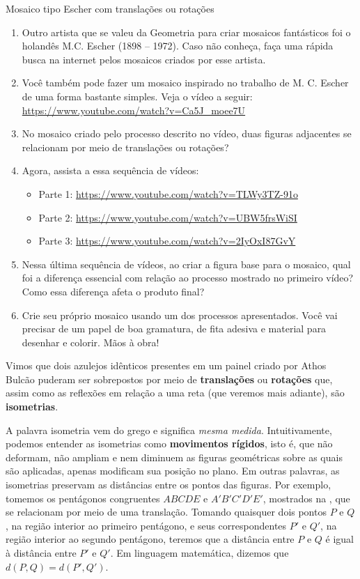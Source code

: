 \begin{task}{Mosaico tipo Escher com translações ou rotações}
\begin{enumerate}
\item Outro artista que se valeu da Geometria para criar mosaicos fantásticos foi o holandês M.C. Escher (1898 – 1972). Caso não conheça, faça uma rápida busca na internet pelos mosaicos criados por esse artista.

\item Você também pode fazer um mosaico inspirado no trabalho de M. C. Escher de uma forma bastante simples. Veja o vídeo a seguir: \url{https://www.youtube.com/watch?v=Ca5J_moee7U}

\item No mosaico criado pelo processo descrito no vídeo, duas figuras adjacentes se relacionam por meio de translações ou rotações?

\item Agora, assista a essa sequência de vídeos: 
\begin{itemize}
\item Parte 1: \url{https://www.youtube.com/watch?v=TLWy3TZ-91o}
\item Parte 2: \url{https://www.youtube.com/watch?v=UBW5frsWiSI}
\item Parte 3: \url{https://www.youtube.com/watch?v=2IyOxI87GvY}
\end{itemize}

\item Nessa última sequência de vídeos, ao criar a figura base para o mosaico, qual foi a diferença essencial com relação ao processo mostrado no primeiro vídeo? Como essa diferença afeta o produto final?

\item Crie seu próprio mosaico usando um dos processos apresentados. Você vai precisar de um papel de boa gramatura, de fita adesiva e material para desenhar e colorir. Mãos à obra!
\end{enumerate}
\end{task}


Vimos que dois azulejos idênticos presentes em um painel criado por Athos Bulcão puderam ser sobrepostos por meio de \textbf{translações} ou \textbf{rotações} que, assim como as reflexões em relação a uma reta (que veremos mais adiante), são \textbf{isometrias}. 

A palavra isometria vem do grego e significa \textit{mesma medida}. Intuitivamente, podemos entender as isometrias como \textbf{movimentos rígidos}, isto é, que não deformam, não ampliam e nem diminuem as figuras geométricas sobre as quais são aplicadas, apenas modificam sua posição no plano. Em outras palavras, as isometrias preservam as distâncias entre os pontos das figuras. Por exemplo, tomemos os pentágonos congruentes $ABCDE$ e $A'B'C'D'E'$, mostrados na , que se relacionam por meio de uma translação. Tomando quaisquer dois pontos $P$ e $Q$, na região interior ao primeiro pentágono, e seus correspondentes $P'$ e $Q'$, na região interior ao segundo pentágono, teremos que a distância entre $P$ e $Q$ é igual à distância entre $P'$ e $Q'$. Em linguagem matemática, dizemos que $d(P,Q) = d(P',Q')$.

